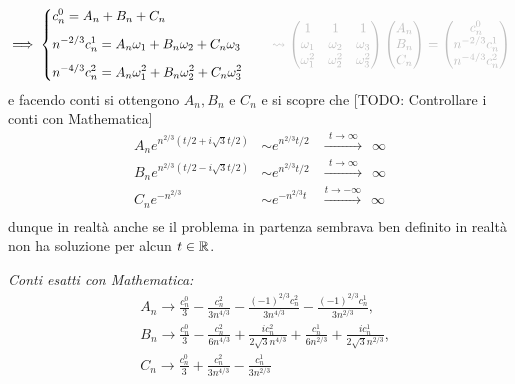$$
\implies
\left\{
\begin{aligned}
	& c_n^0 = A_n + B_n + C_n \\[1ex]
	& n^{-2/3} c_n^1 = A_n \omega_1 + B_n \omega_2 + C_n \omega_3 \\[1ex]
	& n^{-4/3} c_n^2 = A_n \omega_1^2 + B_n \omega_2^2 + C_n \omega_3^2
\end{aligned}
\right.
\qquad
\textcolor{lightgray}{\rightsquigarrow
\begin{pmatrix}
	1 & 1 & 1 \\
	\omega_1 & \omega_2 & \omega_3 \\
	\omega_1^2 & \omega_2^2 & \omega_3^2
\end{pmatrix}
\begin{pmatrix}
	A_n \\
	B_n \\
	C_n
\end{pmatrix}
=
\begin{pmatrix}
	c_n^0 \\
	n^{-2/3} c_n^1 \\
	n^{-4/3} c_n^2
\end{pmatrix}}
$$
e facendo conti si ottengono $A_n, B_n$ e $C_n$ e si scopre che 
[TODO: Controllare i conti con Mathematica]
$$
\begin{aligned}
	A_n e^{n^{2/3}(t/2 + i \sqrt 3 t / 2)} &\sim e^{n^{2/3}t / 2}
	&\xrightarrow{\;\,t \to \infty\,\;} \;\, \infty \\
	B_n e^{n^{2/3}(t/2 - i \sqrt 3 t / 2)} &\sim e^{n^{2/3}t / 2}
	&\xrightarrow{\;\,t \to \infty\,\;} \;\, \infty \\
	C_n e^{-n^{2/3}} &\sim e^{-n^{2/3} t}
	&\xrightarrow{t \to -\infty} \;\, \infty \\
\end{aligned}
$$
dunque in realtà anche se il problema in partenza sembrava ben definito in realtà non ha soluzione per alcun $t \in \mathbb R$.

\textit{Conti esatti con Mathematica:}
$$
\begin{aligned}
	& A_n \to \frac{c_n^0}{3}-\frac{c_n^2}{3 n^{4/3}}-\frac{(-1)^{2/3} c_n^2}{3 n^{4/3}}-\frac{(-1)^{2/3} c_n^1}{3
	n^{2/3}}, \\
	& B_n \to \frac{c_n^0}{3}-\frac{c_n^2}{6 n^{4/3}}+\frac{i c_n^2}{2 \sqrt{3} n^{4/3}}+\frac{c_n^1}{6 n^{2/3}}+\frac{i
	c_n^1}{2 \sqrt{3} n^{2/3}}, \\
	& C_n \to \frac{c_n^0}{3}+\frac{c_n^2}{3 n^{4/3}}-\frac{c_n^1}{3 n^{2/3}}
\end{aligned}
$$

